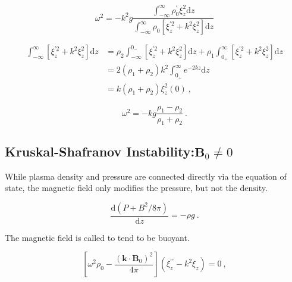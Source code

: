 \documentclass[12pt,a4paper]{article}
\renewcommand{\vec}[1]{\boldsymbol{#1}}
\newcommand{\dif}{\mathrm{d}}
\begin{document}
\begin{equation}
\omega^2 = -k^2 g \frac{\int_{-\infty}^\infty \rho_0^\prime \xi_z^2  \dif z}{\int_{-\infty}^\infty \rho_0[\xi_z^{\prime 2}  + k^2 \xi_z^2 ] \dif z}
\end{equation}



\begin{align}
\nonumber \int_{-\infty}^\infty [\xi_z^{\prime 2}  + k^2 \xi_z^2 ] \dif z &= \rho_2 \int_{-\infty}^{0_{-}}  [\xi_z^{\prime 2}  + k^2 \xi_z^2 ] \dif z +\rho_1 \int^{\infty}_{0_{+}}  [\xi_z^{\prime 2}  + k^2 \xi_z^2 ] \dif z \\
\nonumber &= 2(\rho_1 +\rho_2 )k^2 \int^{\infty}_{0_{+}} e^{-2kz} \dif z \\
&= k(\rho_1 +\rho_2 ) \xi_z^2(0) ~,
\end{align}

\begin{equation}
\omega^2 = -kg \frac{\rho_1 -\rho_2}{\rho_1 +\rho_2} ~.
\end{equation}




























\subsection{Kruskal-Shafranov Instability:$\vec{B}_0 \neq 0$}
While plasma density and pressure are connected directly via the equation of state, the magnetic field only modifies the pressure, but not the density.


\begin{equation*}
\frac{\dif (P +B^2/8\pi)}{\dif z} = -\rho g ~.
\end{equation*}


The magnetic field is called to tend to be buoyant.


\begin{equation*}
\left[\omega^2 \rho_0 - \frac{(\vec{k} \cdot \vec{B}_0)^2}{4\pi}  \right](\xi_z^{\prime\prime} -k^2 \xi_z) = 0 ~,
\end{equation*}
\end{document}
